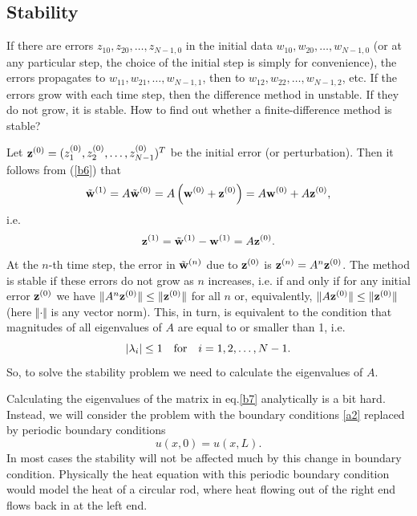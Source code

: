 {{%

\subsection{Stability}

 
If there are errors $z_{10},
z_{20},\dots, z_{N-1,0}$ in the initial data $w_{10},w_{20},\dots,
w_{N-1,0}$ (or at any particular step, the choice of the initial
step is simply for convenience), the errors propagates to
$w_{11},w_{21},\dots, w_{N-1,1}$, then to 
\linebreak[4]$w_{12},w_{22},\dots,
w_{N-1,2}$, etc. If the errors grow with each time step, then the
difference method in unstable. If they do not grow, it is stable.
How to find out whether a finite-difference method is stable?

Let ${\bf z}^{(0)}=(z_{1}^{(0)}, z_{2}^{(0)},\dots, z_{N-1}^{(0)})^{T}$
be the initial error (or perturbation). Then it follows from (\ref{b6})
that
\[
\tilde{\bf w}^{(1)}=A\tilde{\bf w}^{(0)}=A\left({\bf w}^{(0)}+{\bf z}^{(0)}\right)=A{\bf w}^{(0)}+A{\bf z}^{(0)},
\]
i.e.
\[
{\bf z}^{(1)}=\tilde{\bf w}^{(1)}-{\bf w}^{(1)}=A{\bf z}^{(0)}.
\]
At the $n$-th time step, the error in $\tilde{\bf w}^{(n)}$
due to ${\bf z}^{(0)}$ is ${\bf z}^{(n)}=A^{n}{\bf z}^{(0)}$.
The method is stable if these errors do not grow as $n$ increases, i.e. if and only if
for any initial error ${\bf z}^{(0)}$ we have $\Vert A^{n}{\bf z}^{(0)}\Vert\leq \Vert {\bf z}^{(0)}\Vert$
for all $n$ or, equivalently, $\Vert A{\bf z}^{(0)}\Vert\leq \Vert {\bf z}^{(0)}\Vert$ (here $\Vert\cdot\Vert$
is any vector norm). This, in turn, is
equivalent to the condition that magnitudes of all eigenvalues of $A$ are equal to or smaller than 1,
i.e.
\[
\vert\lambda_{i}\vert\leq 1 \quad \hbox{for} \quad i=1, 2, \dots, N-1.
\]
So, to solve the stability problem we need to calculate the eigenvalues of $A$. 

Calculating the eigenvalues of the matrix in eq.\eqref{b7} analytically is a bit hard.
Instead, we will consider the problem with the boundary conditions
\eqref{a2} replaced by periodic boundary conditions
\begin{equation}
u(x,0)=u(x,L).
\end{equation}
In most cases the stability will not be affected much by this change in boundary
condition. Physically the heat equation with this periodic boundary condition 
would model the heat of a circular rod, where heat flowing out of the right
end flows back in at the left end.

}}
